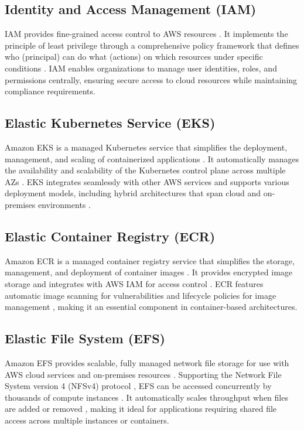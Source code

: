 \subsection{Identity and Access Management (IAM)}
IAM provides fine-grained access control to AWS resources \cite{iam_definition}. It implements the principle of least privilege through a comprehensive policy framework that defines who (principal) can do what (actions) on which resources under specific conditions \cite{iam_security}. IAM enables organizations to manage user identities, roles, and permissions centrally, ensuring secure access to cloud resources while maintaining compliance requirements.

\subsection{Elastic Kubernetes Service (EKS)}
Amazon EKS is a managed Kubernetes service that simplifies the deployment, management, and scaling of containerized applications \cite{eks_definition}. It automatically manages the availability and scalability of the Kubernetes control plane across multiple AZs \cite{eks_definition}. EKS integrates seamlessly with other AWS services and supports various deployment models, including hybrid architectures that span cloud and on-premises environments \cite{eks_deployment}.

\subsection{Elastic Container Registry (ECR)}
Amazon ECR is a managed container registry service that simplifies the storage, management, and deployment of container images \cite{ecr_definition}. It provides encrypted image storage and integrates with AWS IAM for access control \cite{ecr_iam}. ECR features automatic image scanning for vulnerabilities \cite{ecr_image_scanning} and lifecycle policies for image management \cite{ecr_lifecycle}, making it an essential component in container-based architectures.

\subsection{Elastic File System (EFS)}
Amazon EFS provides scalable, fully managed network file storage for use with AWS cloud services and on-premises resources \cite{efs_definition}. Supporting the Network File System version 4 (NFSv4) protocol \cite{efs_work}, EFS can be accessed concurrently by thousands of compute instances \cite{efs_performance}. It automatically scales throughput when files are added or removed \cite{efs_performance}, making it ideal for applications requiring shared file access across multiple instances or containers.

